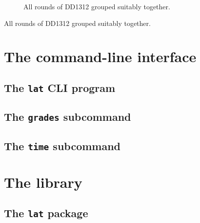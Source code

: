 \begin{figure}
\centering
%
\caption{All rounds of DD1312 grouped suitably together.}
\label{DD1312-grouped-figure}
\end{figure}

\begin{table}
\centering
%
\caption{All rounds of DD1312 grouped suitably together.}
\label{DD1312-grouped-table}
\end{table}


\part{The command-line interface}

\chapter{The \texttt{lat} CLI program}



\chapter{The \texttt{grades} subcommand}




\chapter{The \texttt{time} subcommand}




\part{The library}

\chapter{The \texttt{lat} package}



